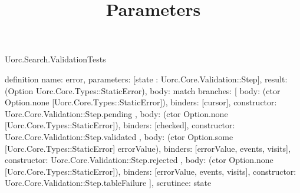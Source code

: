 \begin{lexlean}{Uorc.Search.ValidationTests}
\title{Parameters}
\begin{semanticmodule}
definition{
  name: error,
  parameters: [state : Uorc.Core.Validation::Step],
  result: (Option Uorc.Core.Types::StaticError),
  body: match{
    branches: [
      {
        body: (ctor Option.none [Uorc.Core.Types::StaticError]),
        binders: [cursor],
        constructor: Uorc.Core.Validation::Step.pending
      },
      {
        body: (ctor Option.none [Uorc.Core.Types::StaticError]),
        binders: [checked],
        constructor: Uorc.Core.Validation::Step.validated
      },
      {
        body: (ctor Option.some [Uorc.Core.Types::StaticError] errorValue),
        binders: [errorValue, events, visits],
        constructor: Uorc.Core.Validation::Step.rejected
      },
      {
        body: (ctor Option.none [Uorc.Core.Types::StaticError]),
        binders: [errorValue, events, visits],
        constructor: Uorc.Core.Validation::Step.tableFailure
      }
    ],
    scrutinee: state
  }
}


\end{semanticmodule}
\end{lexlean}
